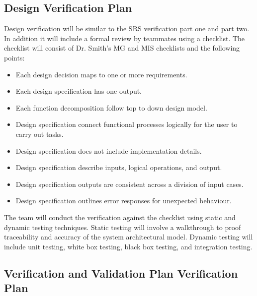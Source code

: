 \documentclass[12pt, titlepage]{article}
\begin{document}

\subsection{Design Verification Plan}

Design verification will be similar to the SRS verification part one and
part two. In addition it will include a formal review by teammates using
a checklist. The checklist will consist of Dr. Smith's MG and MIS checklists and the following points:
\begin{itemize}
    \item Each design decision maps to one or more requirements. 
    \item Each design specification has one output. 
    \item Each function decomposition follow top to down design model.
    \item Design specification connect functional processes logically for the user to carry out tasks.
    \item Design specification does not include implementation details.
    \item Design specification describe inputs, logical operations, and output. 
    \item Design specification outputs are consistent across a division of input cases.
    \item Design specification outlines error responses for unexpected behaviour. 
\end{itemize}

The team will conduct the verification against the checklist using 
static and dynamic testing techniques. Static testing will involve 
a walkthrough to proof traceability and accuracy of the system 
architectural model. Dynamic testing will include unit testing, white box testing, black box testing, and integration testing.




\subsection{Verification and Validation Plan Verification Plan}
\end{document}
